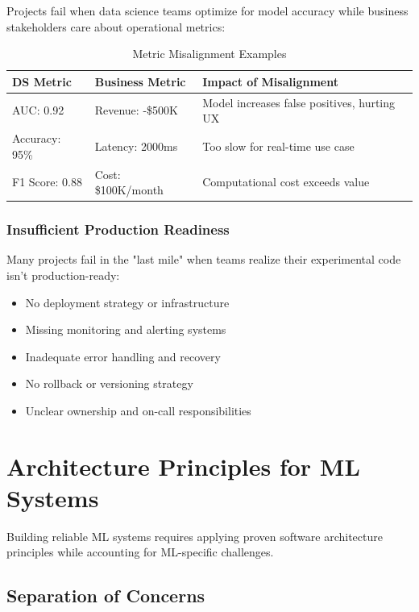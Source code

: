 Projects fail when data science teams optimize for model accuracy while business stakeholders care about operational metrics:

\begin{table}[h]
\centering
\caption{Metric Misalignment Examples}
\begin{tabular}{@{}lll@{}}
\toprule
\textbf{DS Metric} & \textbf{Business Metric} & \textbf{Impact of Misalignment} \\
\midrule
AUC: 0.92 & Revenue: -\$500K & Model increases false positives, hurting UX \\
Accuracy: 95\% & Latency: 2000ms & Too slow for real-time use case \\
F1 Score: 0.88 & Cost: \$100K/month & Computational cost exceeds value \\
\bottomrule
\end{tabular}
\end{table}

\subsubsection{Insufficient Production Readiness}

Many projects fail in the "last mile" when teams realize their experimental code isn't production-ready:

\begin{itemize}
    \item No deployment strategy or infrastructure
    \item Missing monitoring and alerting systems
    \item Inadequate error handling and recovery
    \item No rollback or versioning strategy
    \item Unclear ownership and on-call responsibilities
\end{itemize}

\section{Architecture Principles for ML Systems}

Building reliable ML systems requires applying proven software architecture principles while accounting for ML-specific challenges.

\subsection{Separation of Concerns}

